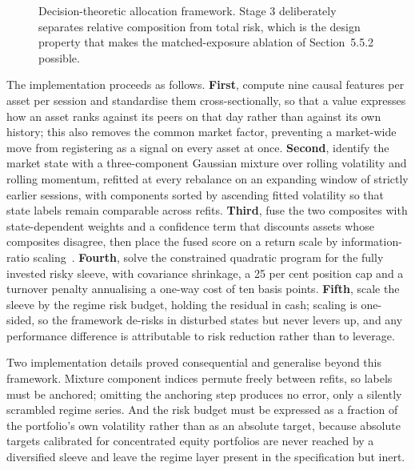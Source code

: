 \begin{figure}[!htb]
{}
\caption[Decision-theoretic allocation framework]{Decision-theoretic allocation framework. Stage 3 deliberately separates relative
composition from total risk, which is the design property that makes the matched-exposure
ablation of Section~5.5.2 possible.}
\label{fig:alloc}
\end{figure}

The implementation proceeds as follows. \textbf{First}, compute nine causal features per
asset per session and standardise them cross-sectionally, so that a value expresses how an
asset ranks against its peers on that day rather than against its own history; this also
removes the common market factor, preventing a market-wide move from registering as a
signal on every asset at once. \textbf{Second}, identify the market state with a
three-component Gaussian mixture over rolling volatility and rolling momentum, refitted at
every rebalance on an expanding window of strictly earlier sessions, with components
sorted by ascending fitted volatility so that state labels remain comparable across
refits. \textbf{Third}, fuse the two composites with state-dependent weights and a
confidence term that discounts assets whose composites disagree, then place the fused
score on a return scale by information-ratio scaling~\cite{grinold2000}. \textbf{Fourth},
solve the constrained quadratic program for the fully invested risky sleeve, with
covariance shrinkage, a 25 per cent position cap and a turnover penalty annualising a
one-way cost of ten basis points. \textbf{Fifth}, scale the sleeve by the regime risk
budget, holding the residual in cash; scaling is one-sided, so the framework de-risks in
disturbed states but never levers up, and any performance difference is attributable to
risk reduction rather than to leverage.

Two implementation details proved consequential and generalise beyond this framework.
Mixture component indices permute freely between refits, so labels must be anchored;
omitting the anchoring step produces no error, only a silently scrambled regime series.
And the risk budget must be expressed as a fraction of the portfolio's own volatility
rather than as an absolute target, because absolute targets calibrated for concentrated
equity portfolios are never reached by a diversified sleeve and leave the regime layer
present in the specification but inert.

